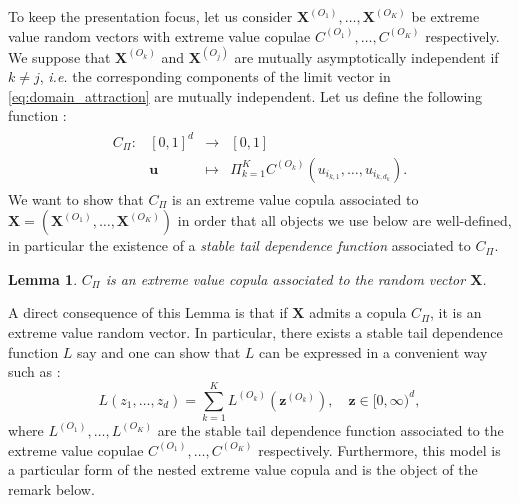 \documentclass[11pt]{article}
\newtheorem{lemma}{Lemma}
\begin{document}
	To keep the presentation focus, let us consider $\textbf{X}^{(O_1)}, \dots, \textbf{X}^{(O_K)}$ be extreme value random vectors with extreme value copulae $C^{(O_1)}, \dots, C^{(O_K)}$ respectively. We suppose that $\textbf{X}^{(O_k)}$ and $\textbf{X}^{(O_j)}$ are mutually asymptotically independent if $k \neq j$, \emph{i.e.} the corresponding components of the limit vector in \eqref{eq:domain_attraction} are mutually independent. Let us define the following function :
	\begin{align*}
		\begin{array}{lrcl}
C_\Pi : & [0,1]^d & \longrightarrow & [0,1] \\
    & \textbf{u} & \longmapsto & \Pi_{k=1}^K C^{(O_k)}(u_{i_{k,1}}, \dots, u_{i_{k,d_k}}). \end{array}
	\end{align*}
	We want to show that $C_\Pi$ is an extreme value copula associated to $\textbf{X} = (\textbf{X}^{(O_1)}, \dots, \textbf{X}^{(O_K)})$ in order that all objects we use below are well-defined, in particular the existence of a \emph{stable tail dependence function} associated to $C_\Pi$.
	\begin{lemma}
		\label{lem:Cevt}
		$C_\Pi$ is an extreme value copula associated to the random vector $\textbf{X}$.
	\end{lemma}
	
	A direct consequence of this Lemma is that if $\textbf{X}$ admits a copula $C_\Pi$, it is an extreme value random vector. In particular, there exists a stable tail dependence function $L$ say and one can show that $L$ can be expressed in a convenient way such as :
	\begin{equation}
		\label{eq:mutual_indep_stdf}
		L\left(z_1, \dots, z_d\right) = \sum_{k=1}^K L^{(O_k)}\left( \textbf{z}^{(O_k)} \right), \quad \textbf{z} \in [0,\infty)^d,
	\end{equation}
	where $L^{(O_1)}, \dots, L^{(O_K)}$ are the stable tail dependence function associated to the extreme value copulae $C^{(O_1)}, \dots, C^{(O_K)}$ respectively. Furthermore, this model is a particular form of the nested extreme value copula and is the object of the remark below.
	
\end{document}

